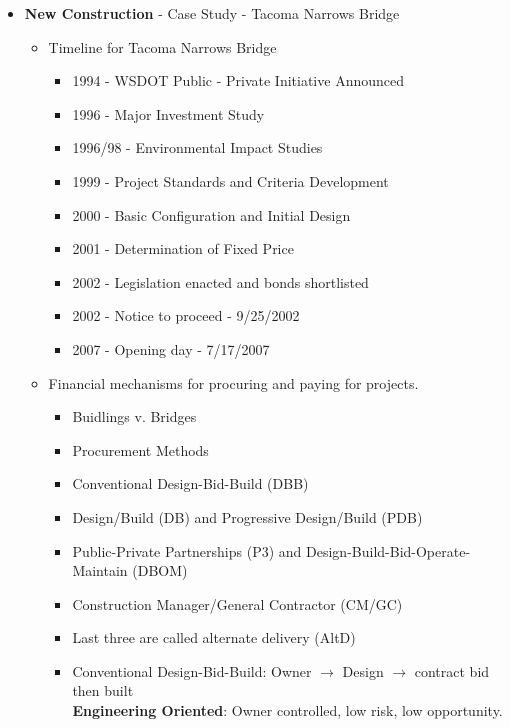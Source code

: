 \documentclass{article}
\begin{document}
\begin{itemize}
\begin{itemize}
\begin{itemize}
            \end{itemize}
        \item \textbf{New Construction} - Case Study - Tacoma Narrows Bridge
            \begin{itemize}
                \item Timeline for Tacoma Narrows Bridge
                \begin{itemize}
                    \item 1994 - WSDOT Public - Private Initiative Announced
                    \item 1996 - Major Investment Study
                    \item 1996/98 - Environmental Impact Studies
                    \item 1999 - Project Standards and Criteria Development
                    \item 2000 - Basic Configuration and Initial Design
                    \item 2001 - Determination of Fixed Price
                    \item 2002 - Legislation enacted and bonds shortlisted
                    \item 2002 - Notice to proceed - 9/25/2002
                    \item 2007 - Opening day - 7/17/2007
                \end{itemize}
                \item Financial mechanisms for procuring and paying for projects.
                \begin{itemize}
                    \item Buidlings v. Bridges
                    \item Procurement Methods
                    \item Conventional Design-Bid-Build (DBB)
                    \item Design/Build (DB) and Progressive Design/Build (PDB)
                    \item Public-Private Partnerships (P3) and Design-Build-Bid-Operate-Maintain (DBOM)
                    \item Construction Manager/General Contractor (CM/GC)
                    \item Last three are called alternate delivery (AltD)
                    \item Conventional Design-Bid-Build: Owner \(\rightarrow\) Design \(\rightarrow\) contract bid then built
                    \\ \textbf{Engineering Oriented}: Owner controlled, low risk, low opportunity.

\end{itemize}
\end{itemize}
\end{itemize}
\end{itemize}
\end{document}
